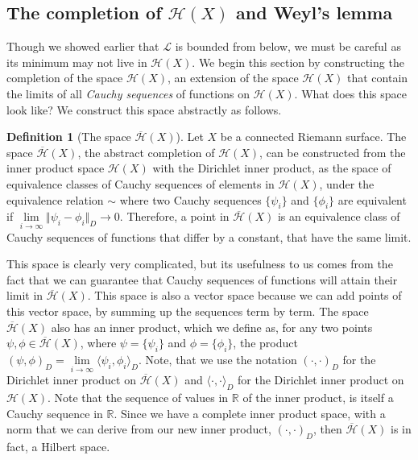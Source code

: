 \documentclass[11pt]{report}
\theoremstyle{definition}
\newtheorem{defn}[thm]{Definition}
\begin{document}
\subsection{The completion of $\mathcal{H}(X)$ and Weyl's lemma}\label{Hilbertsraumsection}
Though we showed earlier that $\mathcal{L}$ is bounded from below, we must be careful as its minimum may not live in $\mathcal{H}(X)$. We begin this section by constructing the completion of the space $\mathcal{H}(X)$, an extension of the space $\mathcal{H}(X)$ that contain the limits of all \emph{Cauchy sequences} of functions on $\mathcal{H}(X)$. What does this space look like? We construct this space abstractly as follows.
\begin{defn}[The space $\overline{\mathcal{H}}(X)$]\label{completeH}
  Let $X$ be a connected Riemann surface. The space $\overline{\mathcal{H}}(X)$, the abstract completion of $\mathcal{H}(X)$, can be constructed from the inner product space $\mathcal{H}(X)$ with the Dirichlet inner product, as the space of equivalence classes of Cauchy sequences of elements in $\mathcal{H}(X)$, under the equivalence relation $\sim$ where two Cauchy sequences $\{\psi_i\}$ and $\{\phi_i\}$ are equivalent if $\lim\limits_{i \rightarrow \infty}\Vert \psi_i - \phi_i\Vert_D \rightarrow 0 $.
  Therefore, a point in $\overline{\mathcal{H}}(X)$ is an equivalence class of Cauchy sequences of functions that differ by a constant, that have the same limit.
\end{defn}
This space is clearly very complicated, but its usefulness to us comes from the fact that we can guarantee that Cauchy sequences of functions will attain their limit in $\overline{\mathcal{H}}(X)$. This space is also a vector space because we can add points of this vector space, by summing up the sequences term by term. The space $\overline{\mathcal{H}}(X)$ also has an inner product, which we define as, for any two points $\psi, \phi \in \overline{\mathcal{H}}(X)$, where $\psi = \{\psi_i\}$ and $\phi = \{\phi_i\}$, the product $( \psi, \phi )_D = \lim\limits_{i \rightarrow \infty} \langle \psi_i, \phi_i \rangle_D$. Note, that we use the notation $( \cdot, \cdot)_D$ for the Dirichlet inner product on $\overline{\mathcal{H}}(X)$ and $\langle \cdot, \cdot \rangle_D$ for the Dirichlet inner product on $\mathcal{H}(X)$. Note that the sequence of values in $\mathbb{R}$ of the inner product, is itself a Cauchy sequence in $\mathbb{R}$. Since we have a complete inner product space, with a norm that we can derive from our new inner product, $( \cdot, \cdot )_D$, then $\overline{\mathcal{H}}(X)$ is in fact, a Hilbert space. 
\end{document}
